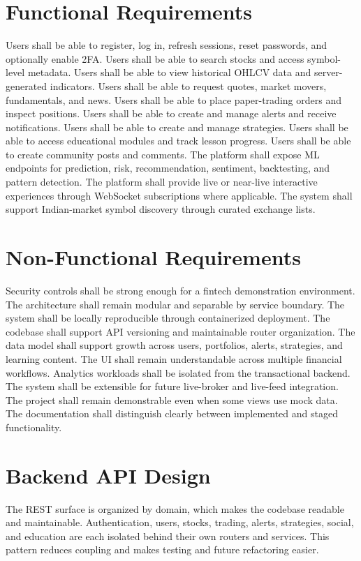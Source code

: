 \documentclass[11pt,a4paper]{article}
\begin{document}
\section{Functional Requirements}
Users shall be able to register, log in, refresh sessions, reset passwords, and optionally enable 2FA. Users shall be able to search stocks and access symbol-level metadata. Users shall be able to view historical OHLCV data and server-generated indicators. Users shall be able to request quotes, market movers, fundamentals, and news. Users shall be able to place paper-trading orders and inspect positions. Users shall be able to create and manage alerts and receive notifications. Users shall be able to create and manage strategies. Users shall be able to access educational modules and track lesson progress. Users shall be able to create community posts and comments. The platform shall expose ML endpoints for prediction, risk, recommendation, sentiment, backtesting, and pattern detection. The platform shall provide live or near-live interactive experiences through WebSocket subscriptions where applicable. The system shall support Indian-market symbol discovery through curated exchange lists.
\section{Non-Functional Requirements}
Security controls shall be strong enough for a fintech demonstration environment. The architecture shall remain modular and separable by service boundary. The system shall be locally reproducible through containerized deployment. The codebase shall support API versioning and maintainable router organization. The data model shall support growth across users, portfolios, alerts, strategies, and learning content. The UI shall remain understandable across multiple financial workflows. Analytics workloads shall be isolated from the transactional backend. The system shall be extensible for future live-broker and live-feed integration. The project shall remain demonstrable even when some views use mock data. The documentation shall distinguish clearly between implemented and staged functionality.
\section{Backend API Design}
The REST surface is organized by domain, which makes the codebase readable and maintainable. Authentication, users, stocks, trading, alerts, strategies, social, and education are each isolated behind their own routers and services. This pattern reduces coupling and makes testing and future refactoring easier.
\end{document}
